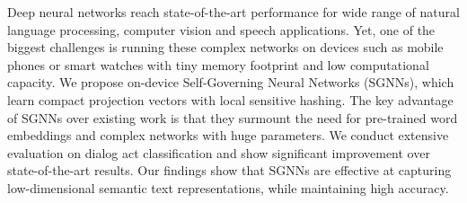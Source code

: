 Deep neural networks reach state-of-the-art performance for wide range of natural language processing, computer vision and speech applications. Yet, one of the biggest challenges is running these complex networks on devices such as mobile phones or smart watches with tiny memory footprint and low computational capacity. We propose on-device Self-Governing Neural Networks (SGNNs), which learn compact projection vectors with local sensitive hashing. The key advantage of SGNNs over existing work is that they surmount the need for pre-trained word embeddings and complex networks with huge parameters. We conduct extensive evaluation on dialog act classification and show significant improvement over state-of-the-art results. Our findings show that SGNNs are effective at capturing low-dimensional semantic text representations, while maintaining high accuracy.
